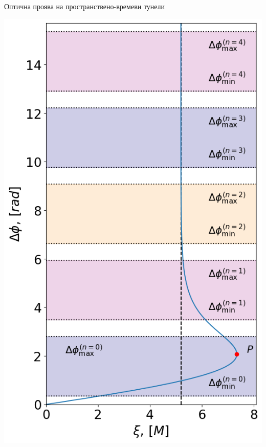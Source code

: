 \documentclass[hyperref={colorlinks,citecolor=blue,linkcolor=blue,urlcolor=blue}]{beamer}
\begin{document}
\begin{frame}{Оптична проява на пространствено-времеви тунели}
\begin{minipage}{6em}
			\includegraphics[scale = 0.2]{Section_6_Morphology_of_the images_of_horizonless_spacetimes/Schw_70_deg_ISCO_impact.png}
		\end{minipage}
				
	\end{frame}
	
\end{document}
